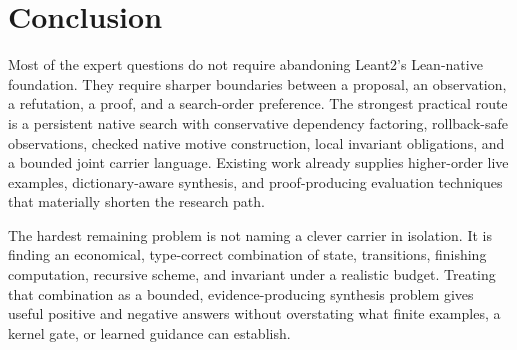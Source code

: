 \documentclass[11pt,a4paper]{article}
\theoremstyle{definition}
\theoremstyle{remark}
\begin{document}
\section{Conclusion}
Most of the expert questions do not require abandoning Leant2's Lean-native
foundation. They require sharper boundaries between a proposal, an observation,
a refutation, a proof, and a search-order preference. The strongest practical
route is a persistent native search with conservative dependency factoring,
rollback-safe observations, checked native motive construction, local
invariant obligations, and a bounded joint carrier language. Existing work
already supplies higher-order live examples, dictionary-aware synthesis, and
proof-producing evaluation techniques that materially shorten the research
path.

The hardest remaining problem is not naming a clever carrier in isolation.
It is finding an economical, type-correct combination of state, transitions,
finishing computation, recursive scheme, and invariant under a realistic
budget. Treating that combination as a bounded, evidence-producing synthesis
problem gives useful positive and negative answers without overstating what
finite examples, a kernel gate, or learned guidance can establish.

\appendix
\end{document}
